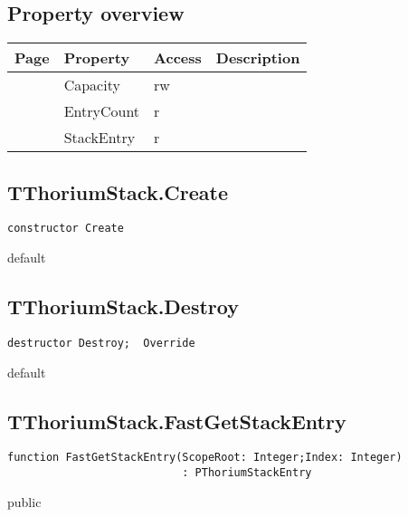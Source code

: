 \subsection{Property overview}
\label{thoriumcorepkg:thorium:tthoriumstack:properties}
\begin{tabularx}{\textwidth}{lllX}
Page & Property & Access & Description \\ \hline
\pageref{thoriumcorepkg:thorium:tthoriumstack:capacity} & Capacity & rw &  \\
\pageref{thoriumcorepkg:thorium:tthoriumstack:entrycount} & EntryCount & r &  \\
\pageref{thoriumcorepkg:thorium:tthoriumstack:stackentry} & StackEntry & r &  \\
\hline
\end{tabularx}
\subsection{TThoriumStack.Create}
\label{thoriumcorepkg:thorium:tthoriumstack:create}
\begin{FPCList}
\Declaration 

\begin{verbatim}
constructor Create
\end{verbatim}
\Visibility
default
\end{FPCList}
\subsection{TThoriumStack.Destroy}
\label{thoriumcorepkg:thorium:tthoriumstack:destroy}
\begin{FPCList}
\Declaration 

\begin{verbatim}
destructor Destroy;  Override
\end{verbatim}
\Visibility
default
\end{FPCList}
\subsection{TThoriumStack.FastGetStackEntry}
\label{thoriumcorepkg:thorium:tthoriumstack:fastgetstackentry}
\begin{FPCList}
\Declaration 

\begin{verbatim}
function FastGetStackEntry(ScopeRoot: Integer;Index: Integer)
                           : PThoriumStackEntry
\end{verbatim}
\Visibility
public
\end{FPCList}
